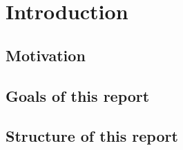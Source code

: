 \chapter{Introduction}
\label{cha:Einleitung}

\section{Motivation}
\label{sec:Motivation}


\section{Goals of this report}
\label{sec:ZielDerArbeit}

\section{Structure of this report}
\label{sec:AufbauDerArbeit}



